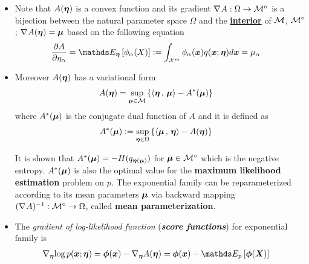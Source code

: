 \documentclass[11pt]{article}
\begin{document}
\begin{itemize}
\item Note that $A(\boldsymbol{\eta})$ is a convex function and its gradient $\nabla_{}{A}: \Omega \rightarrow {\mathcal M}^{\circ}$ is a bijection between the natural parameter space $\Omega$ and the \underline{\textbf{interior}} of ${\mathcal M}$,  ${\mathcal M}^{\circ}$; $\nabla_{}{A}(\boldsymbol{\eta}) = \boldsymbol{\mu}$ based on the following equation 
\begin{align}
\partdiff{A}{\eta_{\alpha}} &= \E{\mb{\eta}}{\phi_{\alpha}(X)} := \int_{\cX^{m}}\phi_{\alpha}(\mb{x}) q(\mb{x}; \mb{\eta}) d\mb{x} = \mu_{\alpha} \label{eqn: partition_first_order}
\end{align}

\item Moreover $A(\boldsymbol{\eta})$ has a variational form 
\begin{align}
A(\boldsymbol{\eta}) &=  \sup_{\boldsymbol{\mu} \in {\mathcal M}}\left\{ \left\langle \boldsymbol{\eta}\,,\, \boldsymbol{\mu} \right\rangle - A^{*}(\boldsymbol{\mu})\right\} \label{eqn: log_partition_variational_form}
\end{align}
where $A^{*}(\boldsymbol{\mu})$ is the conjugate dual function of $A$ and it is defined as
\begin{align}
A^{*}(\boldsymbol{\mu}) &:= \sup_{\boldsymbol{\eta} \in \Omega} \left\{\left\langle \boldsymbol{\mu}\,,\, \boldsymbol{\eta} \right\rangle - A(\boldsymbol{\eta})\right\} \label{eqn: conjugate_dual_partition}
\end{align}

It is shown that $A^{*}(\boldsymbol{\mu})  = -H(q_{\boldsymbol{\eta}(\boldsymbol{\mu})})$ for $\boldsymbol{\mu} \in  {\mathcal M}^{\circ}$ which is the negative entropy. $A^{*}(\boldsymbol{\mu})$ is also the optimal value for the \textbf{maximum likelihood estimation} problem on $p$. The exponential family can be reparameterized according to its mean parameters $\boldsymbol{\mu}$ via backward mapping $(\nabla_{}{A})^{-1}: {\mathcal M}^{\circ} \rightarrow  \Omega$, called \textbf{mean parameterization}.

\item The \emph{gradient of log-likelihood function} (\emph{\textbf{score functions}}) for exponential family is 
\begin{align}
\grad{\mb{\eta}}{\log p(\mb{x}; \mb{\eta})} &= \mb{\phi}(\mb{x}) - \grad{\mb{\eta}}{A(\mb{\eta})} = \mb{\phi}(\mb{x}) - \E{p}{\mb{\phi}(\mb{X})} \label{eqn: score_function_exp_fam}
\end{align}


\end{itemize}
\end{document}
